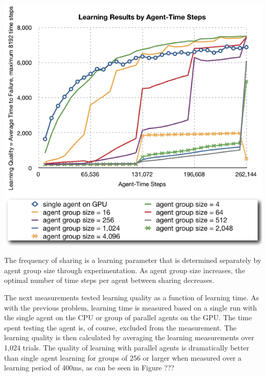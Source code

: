 \documentclass[11pt]{article} %
\begin{document}
\center
\includegraphics[scale=0.8]{fig07}
\begin{flushleft}


The frequency of sharing is a learning parameter that is determined separately by agent group size through experimentation.  As agent group size increases, the optimal number of time steps per agent between sharing decreases. 

The next measurements tested learning quality as a function of learning time.  As with the previous problem, learning time is measured based on a single run with the single agent on the CPU or group of parallel agents on the GPU.  The time spent testing the agent is, of course, excluded from the measurement.  The learning quality is then calculated by averaging the learning measurements over 1,024 trials.  The quality of learning with parallel agents is dramatically better than single agent learning for groups of 256 or larger when measured over a learning period of 400ms, as can be seen in Figure ???

\end{flushleft}
\center
\end{document}
